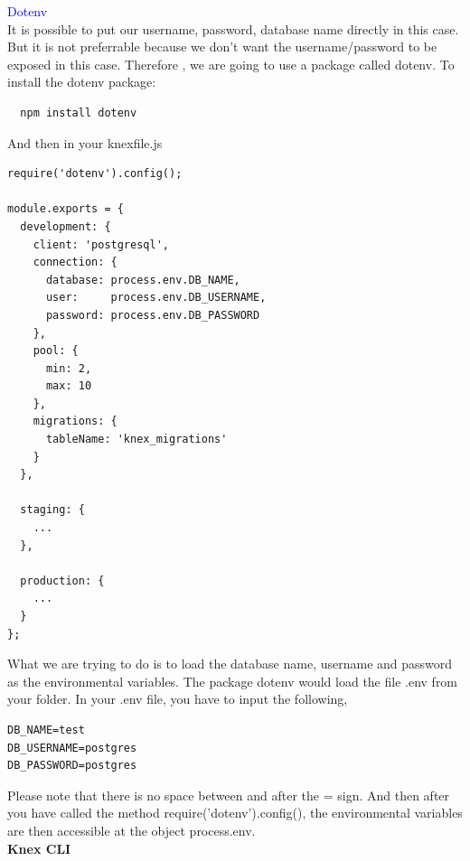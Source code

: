 \documentclass[a4paper]{article}
\begin{document}
\textcolor{blue}{Dotenv}\\

It is possible to put our username, password, database name directly in this case. But it is not preferrable because we don’t want the username/password to be exposed in this case. Therefore , we are going to use a package called dotenv. To install the dotenv package:
\begin{lstlisting}
  npm install dotenv
\end{lstlisting}
And then in your knexfile.js
\begin{lstlisting}
require('dotenv').config();

module.exports = {
  development: {
    client: 'postgresql',
    connection: {
      database: process.env.DB_NAME,
      user:     process.env.DB_USERNAME,
      password: process.env.DB_PASSWORD
    },
    pool: {
      min: 2,
      max: 10
    },
    migrations: {
      tableName: 'knex_migrations'
    } 
  },

  staging: {
    ...
  },

  production: {
    ...
  }
};
\end{lstlisting}
What we are trying to do is to load the database name, username and password as the environmental variables. The package dotenv would load the file .env from your folder. In your .env file, you have to input the following,
\begin{lstlisting}
DB_NAME=test
DB_USERNAME=postgres
DB_PASSWORD=postgres
\end{lstlisting}
Please note that there is no space between and after the = sign. And then after you have called the method require('dotenv').config(), the environmental variables are then accessible at the object process.env.\\

\textbf{Knex CLI}\\
\end{document}
